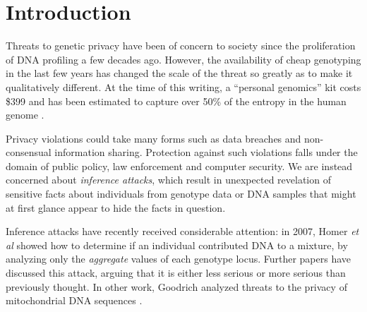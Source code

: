 \documentclass{article}
\begin{document}
\begin{abstract}

\end{abstract}

\section{Introduction}

Threats to genetic privacy have been of concern to society since the proliferation of DNA profiling a few decades ago. However, the availability of cheap genotyping in the last few years has changed the scale of the threat so greatly as to make it qualitatively different. At the time of this writing, a ``personal genomics'' kit costs \$399 \cite{23andme-store} and has been estimated to capture over 50\% of the entropy in the human genome \cite{snpentropy}.

Privacy violations could take many forms such as data breaches and non-consensual information sharing. Protection against such violations falls under the domain of public policy, law enforcement and computer security. We are instead concerned about {\em inference attacks}, which result in unexpected revelation of sensitive facts about individuals from genotype data or DNA samples that might at first glance appear to hide the facts in question.

Inference attacks have recently received considerable attention: in 2007, Homer {\em et al} showed how to determine  if an individual contributed DNA to a mixture, by analyzing only the {\em aggregate} values of each genotype locus. Further papers have discussed this attack, arguing that it is either less serious \cite{sriram} or more serious \cite{gwa-privacy} than previously thought.  In other work, Goodrich analyzed threats to the privacy of mitochondrial DNA sequences \cite{mastermind}.
\end{document}
